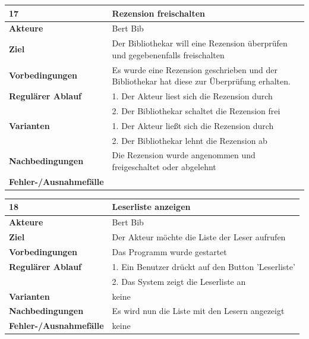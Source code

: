\documentclass[fontsize=12pt,paper=a4,twoside]{scrartcl}
\begin{document}
\begin{table}[htbp]
\label{17}
\begin{tabular}{|l|p{10cm}|}
\hline 
\textbf{17} & \textbf{Rezension freischalten} \\ \hline
\textbf{Akteure} & Bert Bib\\ \hline
\textbf{Ziel} & Der Bibliothekar will eine Rezension überprüfen und gegebenenfalls freischalten \\ \hline
\textbf{Vorbedingungen} & Es wurde eine Rezension geschrieben und der Bibliothekar hat diese zur 
Überprüfung erhalten. \\ \hline
\textbf{Regulärer Ablauf} & 
1. Der Akteur liest sich die Rezension durch \\
&2. Der Bibliothekar schaltet die Rezension frei\\
\hline
\textbf{Varianten} & 
1. Der Akteur ließt sich die Rezension durch \\
&2. Der Bibliothekar lehnt die Rezension ab \\ \hline
\textbf{Nachbedingungen} & Die Rezension wurde angenommen und freigeschaltet oder abgelehnt\\ 
\hline
\textbf{Fehler-/Ausnahmefälle} & \\
\hline
\end{tabular}
\end{table}

\begin{table}[htbp]
\label{18}
\begin{tabular}{|l|p{10cm}|}
\hline 
\textbf{18} & \textbf{Leserliste anzeigen} \\ \hline
\textbf{Akteure} & Bert Bib\\ \hline
\textbf{Ziel} & Der Akteur möchte die Liste der Leser aufrufen  \\ \hline
\textbf{Vorbedingungen} & Das Programm wurde gestartet  \\ \hline
\textbf{Regulärer Ablauf} & 
1. Ein Benutzer drückt auf den Button 'Leserliste' \\
&2. Das System zeigt die Leserliste an\\
\hline
\textbf{Varianten} & 
keine \\ \hline
\textbf{Nachbedingungen} & Es wird nun die Liste mit den Lesern angezeigt \\ \hline
\textbf{Fehler-/Ausnahmefälle} & keine\\
\hline
\end{tabular}
\end{table}
\end{document}

